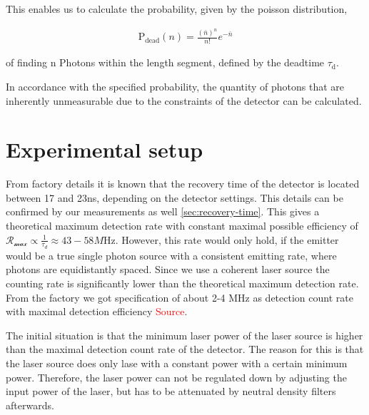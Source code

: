 This enables us to calculate the probability, given by the poisson distribution,

\begin{align}
    \text{P}_{\text{dead}}(n) = \frac{(\bar{n})^n}{n!} e^{-\bar{n}}
\end{align}

of finding n Photons within the length segment, defined by the deadtime $\tau_{\text{d}}$.

In accordance with the specified probability, the quantity of photons that are inherently unmeasurable due to the
constraints of the detector can be calculated.


\section{Experimental setup}\label{sec:experimental_setup}

From factory details it is known that the recovery time of the detector is located between 17 and 23ns, depending on the
detector settings.
This details can be confirmed by our measurements as well \ref{sec:recovery-time}.
This gives a theoretical maximum detection rate with constant maximal possible efficiency of $\mathcal{R_{\max}} \propto \frac{1}{\tau_{d}} \approx 43-58\si{M\Hz}$.
However, this rate would only hold, if the emitter would be a true single photon source with a consistent emitting rate, where
photons are equidistantly spaced.
Since we use a coherent laser source the counting rate is significantly lower than the theoretical maximum detection rate.
From the factory we got specification of about 2-4 MHz as detection count rate with maximal detection efficiency \textcolor{red}{Source}.


The initial situation is that the minimum laser power of the laser source is higher than the maximal detection count rate of the detector.
The reason for this is that the laser source does only lase with a constant power with a certain minimum power.
Therefore, the laser power can not be regulated down by adjusting the input power of the laser, but has to be attenuated
by neutral density filters afterwards.

